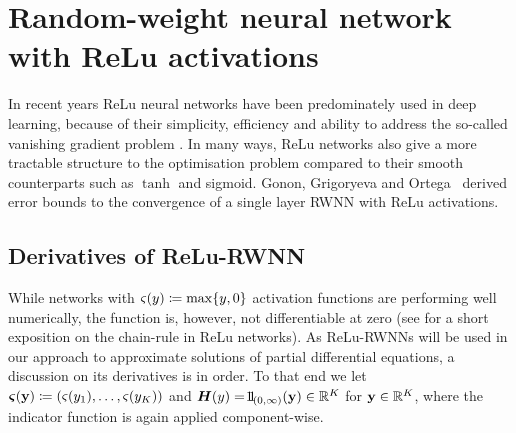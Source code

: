 \section{Random-weight neural network with ReLu activations}\label{sec:ReLu-RWNN}

In recent years ReLu neural networks have been predominately used in deep learning, because of their simplicity, efficiency and ability to address the so-called vanishing gradient problem \cite{LeCun2012EfficientBackProp}. In many ways, ReLu networks also give a more tractable structure to the optimisation problem compared to their smooth counterparts such as $\tanh$ and sigmoid. 
Gonon, Grigoryeva and Ortega~\cite{Gonon2020ApproximationSystems} derived error bounds to the convergence of a single layer RWNN with ReLu activations.

\subsection{Derivatives of ReLu-RWNN}
\label{sec:RWNNderivatives}
While networks with ${\varsigma(y)\coloneqq \max\{y,0\}}$ activation functions are performing well numerically, the function is, however, not differentiable at zero (see \cite{Berner2019TowardsEstimates} for a short exposition on the chain-rule in ReLu networks). As ReLu-RWNNs will be used in our approach to approximate solutions of partial differential equations, a discussion on its derivatives is in order. 
To that end we let $\operatorname{\boldsymbol\varsigma}(\mathbf{y})\coloneqq(\varsigma(y_1),\dots,\varsigma(y_K))$ and $\Hb(y)=\ind_{(0,\infty)}(\yybf)\in\RR^K$ for $\mathbf{y}\in\mathbb{R}^K$, where the indicator function is again applied component-wise. 


